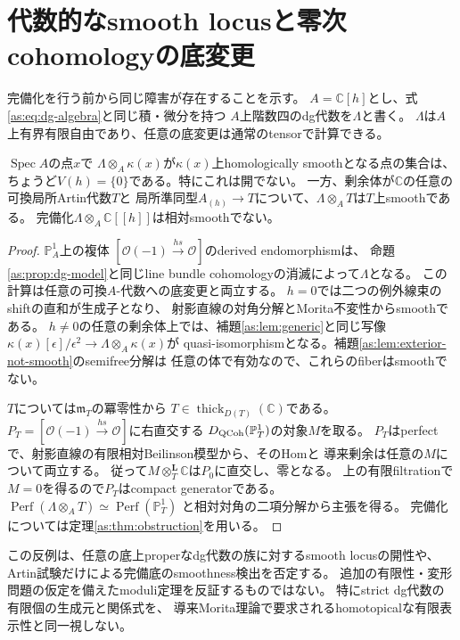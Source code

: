 \section{代数的なsmooth locusと零次cohomologyの底変更}
\label{asl:sec:algebraic}

完備化を行う前から同じ障害が存在することを示す。
$A=\mathbb C[h]$とし、式\eqref{as:eq:dg-algebra}と同じ積・微分を持つ
$A$上階数四のdg代数を$\Lambda$と書く。
$\Lambda$は$A$上有界有限自由であり、任意の底変更は通常のtensorで計算できる。

\begin{theorem}\label{asl:thm:locus}
$\operatorname{Spec}A$の点$x$で
$\Lambda\otimes_A\kappa(x)$が$\kappa(x)$上homologically smoothとなる点の集合は、
ちょうど$V(h)=\{0\}$である。特にこれは開でない。
一方、剰余体が$\mathbb C$の任意の可換局所Artin代数$T$と
局所準同型$A_{(h)}\to T$について、$\Lambda\otimes_A T$は$T$上smoothである。
完備化$\Lambda\otimes_A\mathbb C[[h]]$は相対smoothでない。
\end{theorem}
\begin{proof}
$\mathbb P^1_A$上の複体
$[\mathcal O(-1)\xrightarrow{hs}\mathcal O]$のderived endomorphismは、
命題\ref{as:prop:dg-model}と同じline bundle cohomologyの消滅によって$\Lambda$となる。
この計算は任意の可換$A$-代数への底変更と両立する。
$h=0$では二つの例外線束のshiftの直和が生成子となり、
射影直線の対角分解とMorita不変性からsmoothである。
$h\ne0$の任意の剰余体上では、補題\ref{as:lem:generic}と同じ写像
$\kappa(x)[\epsilon]/\epsilon^2\to\Lambda\otimes_A\kappa(x)$が
quasi-isomorphismとなる。補題\ref{as:lem:exterior-not-smooth}のsemifree分解は
任意の体で有効なので、これらのfiberはsmoothでない。

$T$については$\mathfrak m_T$の冪零性から
$T\in\operatorname{thick}_{D(T)}(\mathbb C)$である。
$P_T=[\mathcal O(-1)\xrightarrow{hs}\mathcal O]$に右直交する
$D_{\rm QCoh}(\mathbb P^1_T)$の対象$M$を取る。
$P_T$はperfectで、射影直線の有限相対Beilinson模型から、そのHomと
導来剰余は任意の$M$について両立する。
従って$M\otimes_T^{\mathbf L}\mathbb C$は$P_0$に直交し、零となる。
上の有限filtrationで$M=0$を得るので$P_T$はcompact generatorである。
$\operatorname{Perf}(\Lambda\otimes_A T)\simeq\operatorname{Perf}(\mathbb P^1_T)$
と相対対角の二項分解から主張を得る。
完備化については定理\ref{as:thm:obstruction}を用いる。
\end{proof}

\begin{remark}
この反例は、任意の底上properなdg代数の族に対するsmooth locusの開性や、
Artin試験だけによる完備底のsmoothness検出を否定する。
追加の有限性・変形問題の仮定を備えたmoduli定理を反証するものではない。
特にstrict dg代数の有限個の生成元と関係式を、
導来Morita理論で要求されるhomotopicalな有限表示性と同一視しない。
\end{remark}

